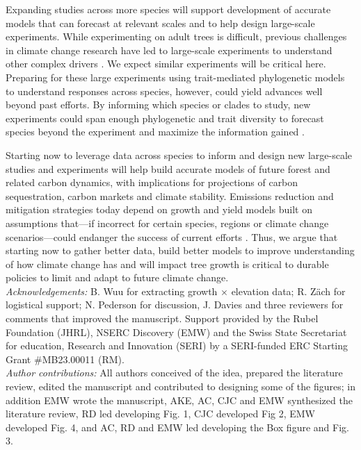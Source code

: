 \documentclass[11pt]{article}
\begin{document}
Expanding studies across more species will support development of accurate models that can forecast at relevant scales and to help design large-scale experiments. While experimenting on adult trees is difficult, previous challenges in climate change research have led to large-scale experiments to understand other complex drivers \citep[e.g. SPRUCE, DroughtNet, Pfynwald,][]{norby2011ecological,hanson2017attaining,smith2016drought}. We expect similar experiments will be critical here. Preparing for these large experiments using trait-mediated phylogenetic models to understand responses across species, however, could yield advances well beyond past efforts. By informing which species or clades to study, new experiments could span enough phylogenetic and trait diversity to forecast species beyond the experiment and maximize the information gained \citep{cadotte2017phylogenies}. 

Starting now to leverage data across species to inform and design new large-scale studies and experiments will help build accurate models of future forest and related carbon dynamics, with implications for projections of carbon sequestration, carbon markets and climate stability. Emissions reduction and mitigation strategies today depend on growth and yield models built on assumptions that---if incorrect for certain species, regions or climate change scenarios---could endanger the success of current efforts \citep{ellis2024principles}. Thus, we argue that starting now to gather better data, build better models to improve understanding of how climate change has and will impact tree growth is critical to durable policies to limit and adapt to future climate change.\\


\emph{Acknowledgements:} B. Wuu for extracting growth $\times$ elevation data; R. Z{\"a}ch for logistical support; N. Pederson for discussion, J. Davies and three reviewers for comments that improved the manuscript. Support provided by the Rubel Foundation (JHRL), NSERC Discovery (EMW) and the Swiss State Secretariat for education, Research and Innovation (SERI) by a SERI-funded ERC Starting Grant #MB23.00011 (RM). \\

\emph{Author contributions:}  All authors conceived of the idea, prepared the literature review, edited the manuscript and contributed to designing some of the figures; in addition EMW wrote the manuscript, AKE, AC, CJC  and EMW synthesized the literature review, RD led developing Fig. 1, CJC developed Fig 2, EMW developed Fig. 4, and AC, RD and EMW led developing the Box figure and Fig. 3. \\
\end{document}
